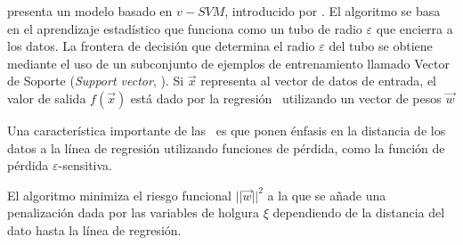 \cite{Chacon2011} presenta un modelo basado en $v-SVM$, introducido por \cite{Scholkopf2000}. El algoritmo se basa en el aprendizaje estadístico que funciona como un tubo de radio $\varepsilon$ que encierra a los datos. La frontera de decisión que determina el radio $\varepsilon$ del tubo se obtiene mediante el uso de un subconjunto de ejemplos de entrenamiento llamado Vector de Soporte ({\em Support vector}, \sv). Si $\vec{x}$ representa al vector de datos de entrada, el valor de salida $f(\vec{x})$ está dado por la regresión \svm\, utilizando un vector de pesos $\vec{w}$

Una característica importante de las \svm\, es que ponen énfasis en la distancia de los datos a la línea de regresión utilizando funciones de pérdida, como la función de pérdida $\varepsilon$-sensitiva.

El algoritmo minimiza el riesgo funcional $||\vec{w}||^2$ a la que se añade una penalización dada por las variables de holgura $\xi$ dependiendo de la distancia del dato hasta la línea de regresión.



